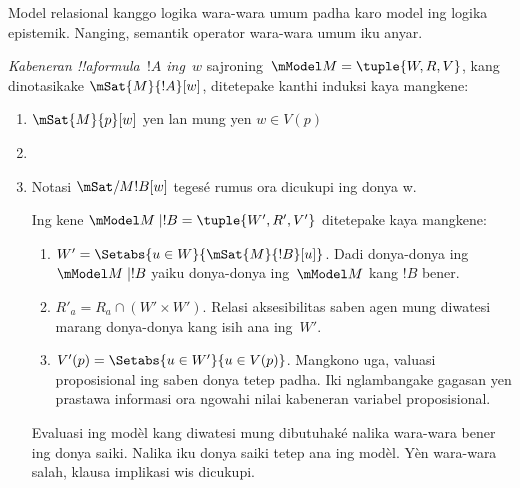 \documentclass[../../../include/open-logic-section]{subfiles}
\begin{document}


Model relasional kanggo logika wara-wara umum padha karo model ing
logika epistemik. Nanging, semantik operator wara-wara umum iku anyar.

\begin{defn} \emph{Kabeneran !!a{formula}~$!A$
  ing~$w$} sajroning~$\mModel M = \tuple{W, R, V}$, kang dinotasikake
  $\mSat{M}{!A}[w]$, ditetepake kanthi induksi kaya mangkene:
  \begin{enumerate}
  \item $\mSat{M}{p}[w]$ yen lan mung yen $w \in V(p)$
  \item{}
  \item{}
Notasi $\mSat/{M}{!B}[w]$ tegesé rumus ora dicukupi ing donya w.

  
  Ing kene $\mModel M \mid !B = \tuple{W', R', V'}$ ditetepake
  kaya mangkene:
  \begin{enumerate}
    \item $W' = \Setabs{ u \in W}{\mSat{M}{!B}[u]}$. Dadi donya-donya ing
      $\mModel M \mid !B$ yaiku donya-donya ing~$\mModel M$ kang $!B$
      bener.
    \item $R'_a = R_a \cap (W' \times W')$. Relasi aksesibilitas saben
      agen mung diwatesi marang donya-donya kang isih ana ing~$W'$.
    \item $V'(p) = \Setabs{ u \in W'}{u \in V(p) }$. Mangkono uga,
      valuasi proposisional ing saben donya tetep padha. Iki
      nglambangake gagasan yen prastawa informasi ora ngowahi nilai
      kabeneran variabel proposisional.
  \end{enumerate}
Evaluasi ing modèl kang diwatesi mung dibutuhaké nalika wara-wara bener ing donya saiki. Nalika iku donya saiki tetep ana ing modèl. Yèn wara-wara salah, klausa implikasi wis dicukupi.
  

\end{enumerate}
\end{defn}
\end{document}
